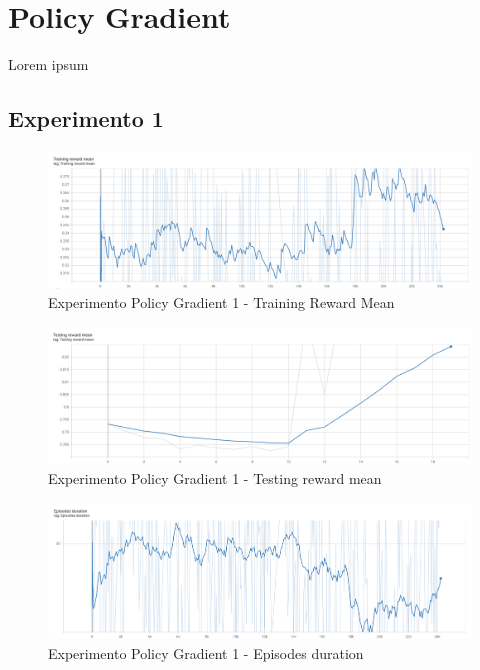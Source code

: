 \section{Policy Gradient}
\label{resultados-policy-gradient}

Lorem ipsum 
\medskip

\subsection{Experimento 1}
\label{resultados-policy-gradient-experimento-1}

\begin{figure}[H]
	\centering
	\includegraphics[width=1\textwidth]{figuras/experiments/policy_gradient/policy_gradient_normalized_image_reward_20_epochs/training_reward_mean.png}
	\caption[Experimento Policy Gradient 1 - Training Reward Mean]{Experimento Policy Gradient 1 - Training Reward Mean}
	\label{fig-experimento-policy-gradient-1-training-reward-mean}
\end{figure}

\begin{figure}[H]
	\centering
	\includegraphics[width=1\textwidth]{figuras/experiments/policy_gradient/policy_gradient_normalized_image_reward_20_epochs/testing_reward_mean.png}
	\caption[Experimento Policy Gradient 1 - Testing reward mean]{Experimento Policy Gradient 1 - Testing reward mean}
	\label{fig-experimento-policy-gradient-1-testing-reward-mean}
\end{figure}
\begin{figure}[H]
	\centering
	\includegraphics[width=1\textwidth]{figuras/experiments/policy_gradient/policy_gradient_normalized_image_reward_20_epochs/episodes_duration.png}
	\caption[Experimento Policy Gradient 1 - Episodes duration]{Experimento Policy Gradient 1 - Episodes duration}
	\label{fig-experimento-policy-gradient-1-episodes-duration}
\end{figure}

